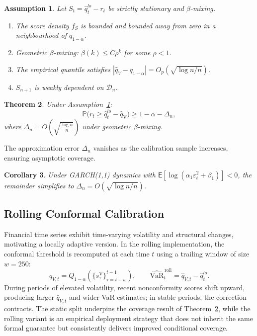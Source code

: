\documentclass[preprint,11pt,authoryear]{elsarticle}
\newtheorem{theorem}{Theorem}[section]
\newtheorem{corollary}[theorem]{Corollary}
\newtheorem{assumption}[theorem]{Assumption}
\newcommand{\VaR}{\mathrm{VaR}}
\newcommand{\E}{\mathsf{E}}
\newcommand{\1}{\boldsymbol{1}}
\newcommand{\qV}{\hat{q}_{\scriptscriptstyle\mathrm{V}}}
\begin{document}
	\begin{assumption}\label{ass:main}
		Let $S_t = \hat{q}^{lo}_t - r_t$ be strictly stationary and $\beta$-mixing.
		\begin{enumerate}[label=\textup{(A\arabic*)}]
			\item\label{ass:density} The score density $f_S$ is bounded and bounded away from zero in a neighbourhood of $q_{1-\alpha}$.
			\item\label{ass:mixing} Geometric $\beta$-mixing: $\beta(k) \leq C\rho^k$ for some $\rho < 1$.
			\item\label{ass:quantile} The empirical quantile satisfies $|\hat{q}_V - q_{1-\alpha}| = O_p(\sqrt{\log n / n})$.
			\item\label{ass:weak_dep} $S_{n+1}$ is weakly dependent on $\mathcal{D}_n$.
		\end{enumerate}
	\end{assumption}

	\begin{theorem}
		\label{thm:dependent_conformal_var}
		Under Assumption~\ref{ass:main}:
		\[
		\mathbb{P}\big(r_{t} \geq \hat{q}_t^{lo} - \qV\big)
		\ge 1 - \alpha - \Delta_n,
		\]
		where $\Delta_n = O\!\left(\sqrt{\frac{\log n}{n}}\right)$
		under geometric $\beta$-mixing.
	\end{theorem}
	
	The approximation error $\Delta_n$ vanishes as the
	calibration sample increases, ensuring asymptotic coverage.
	
	\begin{corollary}
		\label{cor:garch_conformal_var}
		Under GARCH(1,1) dynamics with
		$\E[\log(\alpha_1\varepsilon_t^2 + \beta_1)] < 0$, the
		remainder simplifies to
		$\Delta_n = O(\sqrt{\log n / n})$.
	\end{corollary}
	
	\subsection{Rolling Conformal Calibration}
	\label{sec:rolling_method}
	
	Financial time series exhibit time-varying volatility and
	structural changes, motivating a locally adaptive version. In
	the rolling implementation, the conformal threshold is
	recomputed at each time $t$ using a trailing window of size
	$w = 250$:
	\begin{equation}
		\hat{q}_{V,t} = Q_{1-\alpha}\!\left(
		\{s_\tau^{\mathrm{V}}\}_{\tau=t-w}^{t-1}\right),
		\qquad
		\widehat{\VaR}_t^{\,\mathrm{roll}}
		= \hat{q}_{V,t} - \hat{q}_t^{lo}.
		\label{eq:rolling_qv}
	\end{equation}
	During periods of elevated volatility, recent nonconformity
	scores shift upward, producing larger $\hat{q}_{V,t}$ and
	wider VaR estimates; in stable periods, the correction
	contracts. The static split underpins the coverage result of
	Theorem~\ref{thm:dependent_conformal_var}, while the rolling
	variant is an empirical deployment strategy that does not
	inherit the same formal guarantee but consistently delivers
	improved conditional coverage.
\end{document}
